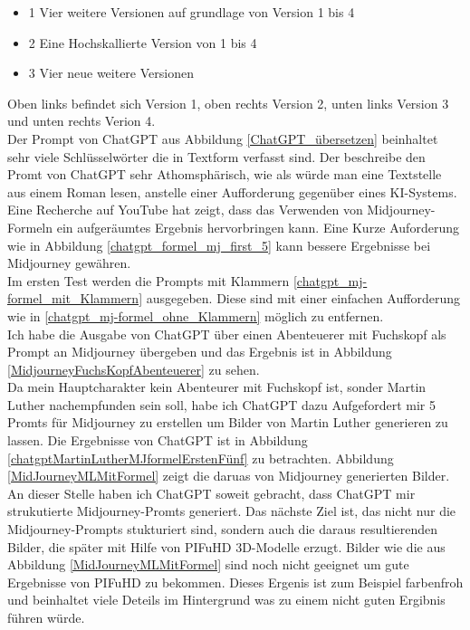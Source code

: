 \begin{itemize}
	\item 1 Vier weitere Versionen auf grundlage von Version 1 bis 4
	\item 2 Eine Hochskallierte Version von 1 bis 4
	\item 3 Vier neue weitere Versionen
\end{itemize}
Oben links befindet sich Version 1, oben rechts Version 2, unten links Version 3 und unten rechts Verion 4.
\\
Der Prompt von ChatGPT aus Abbildung \ref{ChatGPT_übersetzen} beinhaltet sehr viele Schlüsselwörter die in Textform verfasst sind. Der beschreibe den Promt von ChatGPT sehr Athomsphärisch, wie als würde man eine Textstelle aus einem Roman lesen, anstelle einer Aufforderung gegenüber eines KI-Systems.
\\
Eine Recherche auf YouTube hat zeigt, dass das Verwenden von Midjourney-Formeln ein aufgeräumtes Ergebnis hervorbringen kann. Eine Kurze Auforderung wie in Abbildung \ref{chatgpt_formel_mj_first_5} kann bessere Ergebnisse bei Midjourney gewähren.
\\
Im ersten Test werden die Prompts mit Klammern \ref{chatgpt_mj-formel_mit_Klammern} ausgegeben. Diese sind mit einer einfachen Aufforderung wie in \ref{chatgpt_mj-formel_ohne_Klammern} möglich zu entfernen.
\\
Ich habe die Ausgabe von ChatGPT über einen Abenteuerer mit Fuchskopf als Prompt an Midjourney übergeben und das Ergebnis ist in Abbildung \ref{MidjourneyFuchsKopfAbenteuerer} zu sehen.
\\
Da mein Hauptcharakter kein Abenteurer mit Fuchskopf ist, sonder Martin Luther nachempfunden sein soll, habe ich ChatGPT dazu Aufgefordert mir 5 Promts für Midjourney zu erstellen um Bilder von Martin Luther generieren zu lassen. Die Ergebnisse von ChatGPT ist in Abbildung \ref{chatgptMartinLutherMJformelErstenFünf} zu betrachten. Abbildung \ref{MidJourneyMLMitFormel} zeigt die daruas von Midjourney generierten Bilder.
\\
An dieser Stelle haben ich ChatGPT soweit gebracht, dass ChatGPT mir strukutierte Midjourney-Promts generiert. Das nächste Ziel ist, das nicht nur die Midjourney-Prompts stukturiert sind, sondern auch die daraus resultierenden Bilder, die später mit Hilfe von PIFuHD 3D-Modelle erzugt. Bilder wie die aus Abbildung  \ref{MidJourneyMLMitFormel} sind noch nicht geeignet um gute Ergebnisse von PIFuHD zu bekommen. Dieses Ergenis ist zum Beispiel farbenfroh und beinhaltet viele Deteils im Hintergrund was zu einem nicht guten Ergibnis führen würde.
